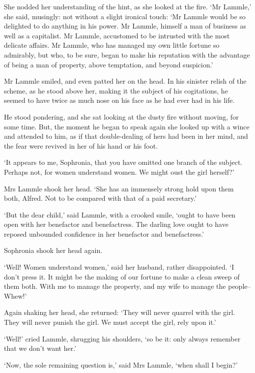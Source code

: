 She nodded her understanding of the hint, as she looked at the fire. ‘Mr
Lammle,’ she said, musingly: not without a slight ironical touch: ‘Mr
Lammle would be so delighted to do anything in his power. Mr Lammle,
himself a man of business as well as a capitalist. Mr Lammle, accustomed
to be intrusted with the most delicate affairs. Mr Lammle, who has
managed my own little fortune so admirably, but who, to be sure, began
to make his reputation with the advantage of being a man of property,
above temptation, and beyond suspicion.’

Mr Lammle smiled, and even patted her on the head. In his sinister
relish of the scheme, as he stood above her, making it the subject of
his cogitations, he seemed to have twice as much nose on his face as he
had ever had in his life.

He stood pondering, and she sat looking at the dusty fire without
moving, for some time. But, the moment he began to speak again she
looked up with a wince and attended to him, as if that double-dealing of
hers had been in her mind, and the fear were revived in her of his hand
or his foot.

‘It appears to me, Sophronia, that you have omitted one branch of the
subject. Perhaps not, for women understand women. We might oust the girl
herself?’

Mrs Lammle shook her head. ‘She has an immensely strong hold upon them
both, Alfred. Not to be compared with that of a paid secretary.’

‘But the dear child,’ said Lammle, with a crooked smile, ‘ought to have
been open with her benefactor and benefactress. The darling love
ought to have reposed unbounded confidence in her benefactor and
benefactress.’

Sophronia shook her head again.

‘Well! Women understand women,’ said her husband, rather disappointed.
‘I don’t press it. It might be the making of our fortune to make a
clean sweep of them both. With me to manage the property, and my wife to
manage the people--Whew!’

Again shaking her head, she returned: ‘They will never quarrel with the
girl. They will never punish the girl. We must accept the girl, rely
upon it.’

‘Well!’ cried Lammle, shrugging his shoulders, ‘so be it: only always
remember that we don’t want her.’

‘Now, the sole remaining question is,’ said Mrs Lammle, ‘when shall I
begin?’

